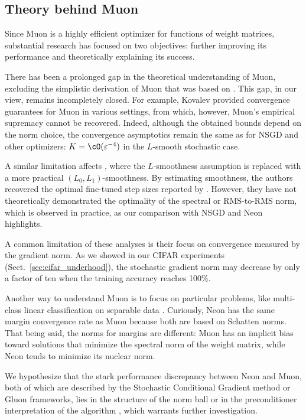 \documentclass[smallextended,referee,envcountsect]{svjour3}
\renewcommand{\epsilon}{\varepsilon}
\newcommand{\sectionref}[1]{Sect.~\ref{#1}}
\begin{document}
 \subsection{Theory behind Muon}
 Since Muon \citep{jordan2024muon} is a highly efficient optimizer for functions of weight matrices, substantial research has focused on two objectives: further improving its performance and theoretically explaining its success.
 
 There has been a prolonged gap in the theoretical understanding of Muon, excluding the simplistic derivation of Muon \citep{bernstein2025deriving} that was based on \citep{bernstein2024oldoptimizernewnorm}. This gap, in our view, remains incompletely closed. For example, Kovalev \citep{kovalev2025understanding} provided convergence guarantees for Muon in various settings, from which, however, Muon's empirical supremacy cannot be recovered. Indeed, although the obtained bounds depend on the norm choice, the convergence asymptotics remain the same as for NSGD and other optimizers: $K = \cO(\epsilon^{-4})$ in the $L$-smooth stochastic case.
 
 A similar limitation affects \citep{riabinin2025gluon}, where the $L$-smoothness assumption is replaced with a more practical $(L_0, L_1)$-smoothness. By estimating smoothness, the authors recovered the optimal fine-tuned step sizes reported by \citep{pethick2025training}. However, they have not theoretically demonstrated the optimality of the spectral or RMS-to-RMS norm, which is observed in practice, as our comparison with NSGD and Neon highlights.
 
 A common limitation of these analyses is their focus on convergence measured by the gradient norm. As we showed in our CIFAR experiments (\sectionref{sec:cifar_underhood}), the stochastic gradient norm may decrease by only a factor of ten when the training accuracy reaches 100\%.
 
 Another way to understand Muon is to focus on particular problems, like multi-class linear classification on separable data \citep{fan2025implicit}. Curiously, Neon has the same margin convergence rate as Muon because both are based on Schatten norms. That being said, the norms for margins are different: Muon has an implicit bias toward solutions that minimize the spectral norm of the weight matrix, while Neon tends to minimize its nuclear norm.

 We hypothesize that the stark performance discrepancy between Neon and Muon, both of which are described by the Stochastic Conditional Gradient method \citep{pethick2025training} or Gluon \citep{riabinin2025gluon} frameworks, lies in the structure of the norm ball or in the preconditioner interpretation of the algorithm \citep{pethick2025trainingneuralnetworksscale}, which warrants further investigation.
\end{document}
